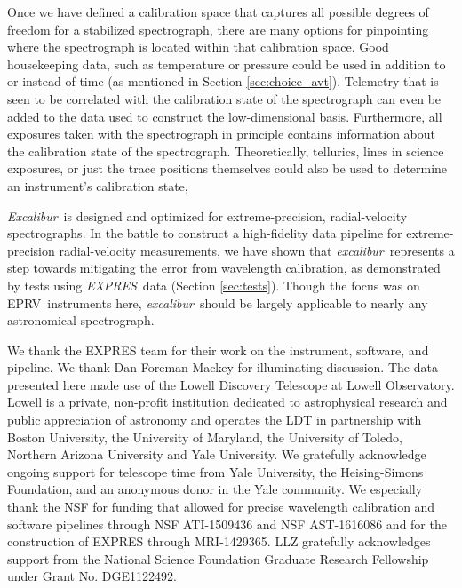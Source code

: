 \documentclass[twocolumn,table,xcolor,trackchanges]{aastex63}
\newcommand{\project}[1]{\textsl{#1}}
\newcommand{\name}{\project{excalibur}}
\newcommand{\Name}{\project{Excalibur}}
\newcommand{\acronym}[1]{{\small{#1}}}
\newcommand{\expres}{\project{\acronym{EXPRES}}}
\newcommand{\eprv}{\acronym{EPRV}}
\begin{document}
Once we have defined a calibration space that captures all possible degrees of freedom for a stabilized spectrograph, there are many options for pinpointing where the spectrograph is located within that calibration space.  Good housekeeping data, such as temperature or pressure could be used in addition to or instead of time (as mentioned in Section \ref{sec:choice_avt}).  Telemetry that is seen to be correlated with the calibration state of the spectrograph can even be added to the data used to construct the low-dimensional basis.  Furthermore, all exposures taken with the spectrograph in principle contains information about the calibration state of the spectrograph.  Theoretically, tellurics, lines in science exposures, or just the trace positions themselves could also be used to determine an instrument's calibration state, 

\Name\ is designed and optimized for extreme-precision, radial-velocity spectrographs.  In the battle to construct a high-fidelity data pipeline for extreme-precision radial-velocity measurements, we have shown that \name\ represents a step towards mitigating the error from wavelength calibration, as demonstrated by tests using \expres\ data (Section \ref{sec:tests}).  Though the focus was on \eprv\ instruments here, \name\ should be largely applicable to nearly any astronomical spectrograph.



\acknowledgements
We thank the EXPRES team for their work on the instrument, software, and pipeline.  We thank Dan Foreman-Mackey for illuminating discussion.  The data presented here made use of the Lowell Discovery Telescope at Lowell Observatory. Lowell is a private, non-profit institution dedicated to astrophysical research and public appreciation of astronomy and operates the LDT in partnership with Boston University, the University of Maryland, the University of Toledo, Northern Arizona University and Yale University. We gratefully acknowledge ongoing support for telescope time from Yale University, the Heising-Simons Foundation, and an anonymous donor in the Yale community. We especially thank the NSF for funding that allowed for precise wavelength calibration and software pipelines through NSF ATI-1509436 and NSF AST-1616086 and for the construction of EXPRES through MRI-1429365.  LLZ gratefully acknowledges support from the National Science Foundation Graduate Research Fellowship under Grant No. DGE1122492.


\end{document}
